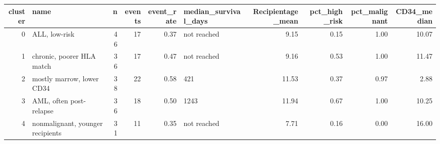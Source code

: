 \begin{tabular}{rlrrrlrrrr}
\toprule
cluster & name & n & events & event\_rate & median\_survival\_days & Recipientage\_mean & pct\_high\_risk & pct\_malignant & CD34\_median \\
\midrule
0 & ALL, low-risk & 46 & 17 & 0.37 & not reached & 9.15 & 0.15 & 1.00 & 10.07 \\
1 & chronic, poorer HLA match & 36 & 17 & 0.47 & not reached & 9.16 & 0.53 & 1.00 & 11.47 \\
2 & mostly marrow, lower CD34 & 38 & 22 & 0.58 & 421 & 11.53 & 0.37 & 0.97 & 2.88 \\
3 & AML, often post-relapse & 36 & 18 & 0.50 & 1243 & 11.94 & 0.67 & 1.00 & 10.25 \\
4 & nonmalignant, younger recipients & 31 & 11 & 0.35 & not reached & 7.71 & 0.16 & 0.00 & 16.00 \\
\bottomrule
\end{tabular}
